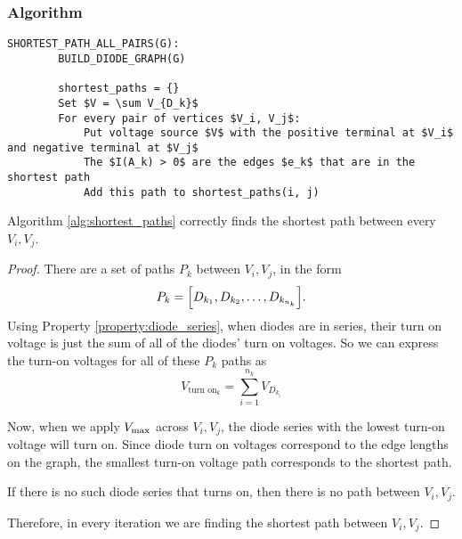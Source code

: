 \subsubsection{Algorithm}

\begin{lstlisting}[label={alg:shortest_paths}]
	SHORTEST_PATH_ALL_PAIRS(G):
		BUILD_DIODE_GRAPH(G)

		shortest_paths = {}
		Set $V = \sum V_{D_k}$
		For every pair of vertices $V_i, V_j$:
			Put voltage source $V$ with the positive terminal at $V_i$ and negative terminal at $V_j$
			The $I(A_k) > 0$ are the edges $e_k$ that are in the shortest path
			Add this path to shortest_paths(i, j)
\end{lstlisting}

\begin{theorem}
  Algorithm \ref{alg:shortest_paths} correctly finds the shortest path between every $V_i, V_j$.
\end{theorem}
\begin{proof}
  There are a set of paths $P_k$ between $V_i, V_j$, in the form
  \begin{equation}
    P_k = \pbra{
      D_{k_1}, D_{k_2}, \dots, D_{k_{n_k}}
    }.
    \label{eq:diode_paths}
  \end{equation}
  Using Property \ref{property:diode_series}, when diodes are in series,
  their turn on voltage is just the sum of all of the diodes' turn on
  voltages. So we can express the turn-on voltages for all of these $P_k$ paths as
  \begin{equation}
    V_{\text{turn on}_k} = \sum_{i=1}^{n_k} V_{D_{k_i}}
  \end{equation}

  Now, when we apply $V_\text{max}$ across $V_i, V_j$, the diode series with the
  lowest turn-on voltage will turn on. Since diode turn on voltages
  correspond to the edge lengths on the graph, the smallest turn-on voltage
  path corresponds to the shortest path.

  If there is no such diode series that turns on, then there is no path between $V_i, V_j$.

  Therefore, in every iteration we are finding the shortest path between $V_i, V_j$.
\end{proof}

